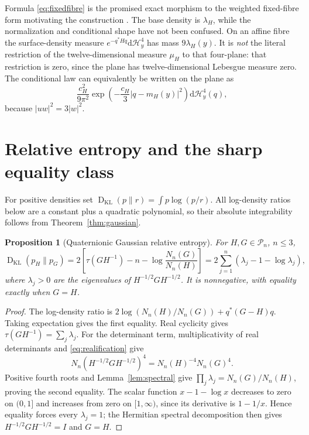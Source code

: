\documentclass[11pt,a4paper]{article}
\numberwithin{equation}{section}
\newtheorem{proposition}[theorem]{Proposition}
\theoremstyle{definition}
\theoremstyle{remark}
\newcommand{\PP}{\mathcal P}
\newcommand{\KL}{\operatorname{D}_{\mathrm{KL}}}
\newcommand{\rtr}{\tau}
\begin{document}
Formula \eqref{eq:fixedfibre} is the promised exact morphism to the
weighted fixed-fibre form motivating the construction
\cite{Nolan2025Threads,NolanRepository2025MBPF}. The base density is
$\lambda_H$, while the normalization and conditional shape have not been
confused. On an affine fibre the surface-density measure
$e^{-q^*Hq}\mathrm d\mathcal H_y^4$ has mass $9\lambda_H(y)$.
It is \emph{not} the literal restriction of the twelve-dimensional
measure $\mu_H$ to that four-plane: that restriction is zero, since
the plane has twelve-dimensional Lebesgue measure zero. The conditional
law can equivalently be written on the plane as
\begin{equation}\label{eq:surfacedensity}
\frac{c_H^2}{9\pi^2}
\exp\!\left(-\frac{c_H}{3}|q-m_H(y)|^2\right)
\mathrm d\mathcal H_y^4(q),
\end{equation}
because $|uw|^2=3|w|^2$.

\section{Relative entropy and the sharp equality class}\label{sec:KL}

For positive densities set $\KL(p\|r)=\int p\log(p/r)$.
All log-density ratios below are a constant plus a quadratic polynomial,
so their absolute integrability follows from Theorem~\ref{thm:gaussian}.

\begin{proposition}[Quaternionic Gaussian relative entropy]\label{prop:KL}
For $H,G\in\PP_n$, $n\le3$,
\begin{equation}\label{eq:KL}
\KL(p_H\|p_G)
=2\left[\rtr(GH^{-1})-n-\log\frac{N_n(G)}{N_n(H)}\right]
=2\sum_{j=1}^n(\lambda_j-1-\log\lambda_j),
\end{equation}
where $\lambda_j>0$ are the eigenvalues of $H^{-1/2}GH^{-1/2}$.
It is nonnegative, with equality exactly when $G=H$.
\end{proposition}
\begin{proof}
The log-density ratio is
$2\log(N_n(H)/N_n(G))+q^*(G-H)q$.
Taking expectation gives the first equality. Real cyclicity gives
$\rtr(GH^{-1})=\sum_j\lambda_j$.
For the determinant term, multiplicativity of real determinants and
\eqref{eq:realification} give
\[
N_n(H^{-1/2}GH^{-1/2})^4=N_n(H)^{-4}N_n(G)^4.
\]
Positive fourth roots and Lemma~\ref{lem:spectral} give
$\prod_j\lambda_j=N_n(G)/N_n(H)$, proving the second equality.
The scalar function $x-1-\log x$ decreases to zero on $(0,1]$ and
increases from zero on $[1,\infty)$, since its derivative is $1-1/x$.
Hence equality forces every $\lambda_j=1$; the Hermitian spectral
decomposition then gives $H^{-1/2}GH^{-1/2}=I$ and $G=H$.
\end{proof}
\end{document}
